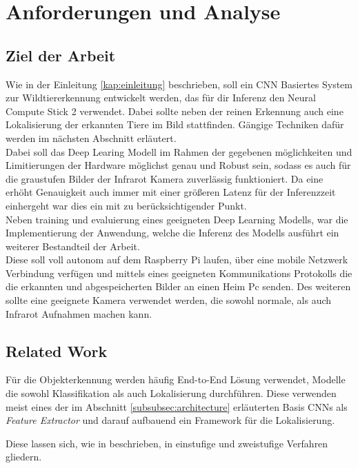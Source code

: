 \chapter{Anforderungen und Analyse}\label{kap:anforderunganalyse}

\section{Ziel der Arbeit}\label{sec:zielderarbeit}


Wie in der Einleitung \ref{kap:einleitung} beschrieben, soll 
ein CNN Basiertes System zur Wildtiererkennung entwickelt 
werden, das für dir Inferenz den Neural Compute Stick 2 verwendet.
Dabei sollte neben der reinen Erkennung auch eine Lokalisierung 
der erkannten Tiere im Bild stattfinden. Gängige Techniken dafür 
werden im nächsten Abschnitt erläutert.
\\
Dabei soll das Deep Learing Modell im Rahmen der gegebenen 
möglichkeiten und Limitierungen der Hardware möglichst 
genau und Robust sein, sodass es auch für die graustufen 
Bilder der Infrarot Kamera zuverlässig funktioniert.
Da eine erhöht Genauigkeit auch immer mit einer größeren
Latenz für der Inferenzzeit einhergeht war dies ein mit 
zu berücksichtigender Punkt.
\\
Neben training und evaluierung eines geeigneten Deep Learning Modells,
war die Implementierung der Anwendung, welche die Inferenz 
des Modells ausführt ein weiterer Bestandteil der Arbeit.
\\
Diese soll voll autonom auf dem Raspberry Pi laufen,
über eine mobile Netzwerk Verbindung verfügen und 
mittels eines geeigneten Kommunikations Protokolls die 
die erkannten und abgespeicherten Bilder an einen
Heim Pc senden.
Des weiteren sollte eine geeignete Kamera verwendet werden, die 
sowohl normale, als auch Infrarot Aufnahmen machen kann.


\section{Related Work}\label{sec:related_work}

Für die Objekterkennung werden häufig End-to-End Lösung verwendet,
Modelle die sowohl Klassifikation als auch Lokalisierung 
durchführen.
Diese verwenden meist eines der im Abschnitt 
\ref{subsubsec:architecture} erläuterten Basis CNNs als  
\textit{Feature Extractor} und darauf aufbauend ein Framework
für die Lokalisierung. 

Diese lassen sich, wie in \cite{wengObjectDetectionPart2018} beschrieben,
in einstufige und zweistufige Verfahren gliedern. 

